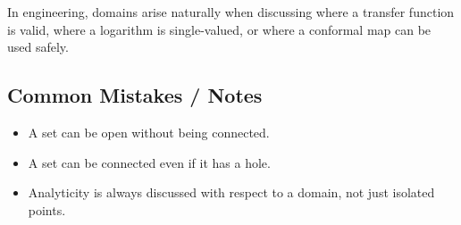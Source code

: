 \begin{noteBox}
    In engineering, domains arise naturally when discussing where a transfer function is valid, where a logarithm is single-valued, or where a conformal map can be used safely.
\end{noteBox}

\subsection*{Common Mistakes / Notes}

\begin{itemize}
    \item A set can be open without being connected.
    \item A set can be connected even if it has a hole.
    \item Analyticity is always discussed with respect to a domain, not just isolated points.
\end{itemize}